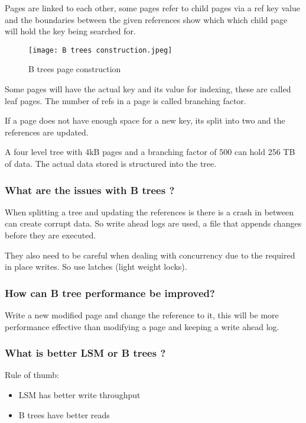 \documentclass[11pt]{scrartcl} %
\begin{document}
Pages are linked to each other, some pages refer to child pages via a ref key value and the boundaries between the
given references show which which child page will hold the key being searched for.

\begin{figure}[h] %
	\centering
	\texttt{[image: B trees construction.jpeg]} %
	\caption{B trees page construction}
\end{figure}

Some pages will have the actual key and its value for indexing, these are called leaf pages. The number
of refs in a page is called branching factor. 

If a page does not have enough space for a new key, its split into two and the references are updated.

A four level tree with 4kB pages and a branching factor of 500 can hold 256 TB of data. The actual data
stored is structured into the tree.

\subsubsection{What are the issues with B trees ?}

When splitting a tree and updating the references is there is a crash in between can create corrupt data.
So write ahead logs are used, a file that appends changes before they are executed.

They also need to be careful when dealing with concurrency due to the required in place writes. So use
latches (light weight locks).

\subsubsection{How can B tree performance be improved?}

Write a new modified page and change the reference to it, this will be more performance effective than
modifying a page and keeping a write ahead log.

\subsubsection{What is better LSM or B trees ?}

Rule of thumb:

\begin{itemize}
	\item LSM has better write throughput
	\item B trees have better reads
\end{itemize}
\end{document}
